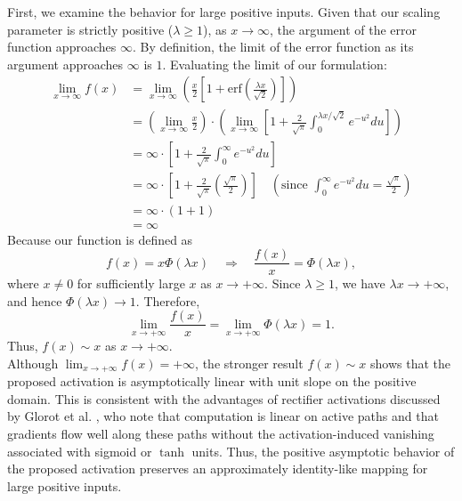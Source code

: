 \documentclass[11pt]{article}
\begin{document}
\noindent First, we examine the behavior for large positive inputs. Given that our scaling parameter is strictly positive ($\lambda \geq 1$), as $x \to \infty$, the argument of the error function approaches $\infty$. By definition, the limit of the error function as its argument approaches $\infty$ is $1$. Evaluating the limit of our formulation:
\begin{align*}
\lim_{x \to \infty} f(x) &= \lim_{x \to \infty} \left( \frac{x}{2} \left[ 1 + \text{erf}\left( \frac{\lambda x}{\sqrt{2}} \right) \right] \right) \\
&= \left( \lim_{x \to \infty} \frac{x}{2} \right) \cdot \left( \lim_{x \to \infty} \left[ 1 + \frac{2}{\sqrt{\pi}} \int_{0}^{\lambda x / \sqrt{2}} e^{-u^2} du \right] \right) \\
&= \infty \cdot \left[ 1 + \frac{2}{\sqrt{\pi}} \int_{0}^{\infty} e^{-u^2} du \right] \\
&= \infty \cdot \left[ 1 + \frac{2}{\sqrt{\pi}} \left( \frac{\sqrt{\pi}}{2} \right) \right] \quad \left(\text{since } \int_{0}^{\infty} e^{-u^2} du = \frac{\sqrt{\pi}}{2}\right) \\
&= \infty \cdot (1 + 1) \\
&= \infty
\end{align*}
\noindent Because our function is defined as 
\begin{equation*}
f(x) = x\Phi(\lambda x)
\quad\Longrightarrow\quad
\frac{f(x)}{x} = \Phi(\lambda x),
\end{equation*}
where $x \neq 0$ for sufficiently large $x$ as $x \rightarrow +\infty$.
Since $\lambda \geq 1$, we have $\lambda x \rightarrow +\infty$, and hence
$\Phi(\lambda x) \rightarrow 1$. Therefore,
\begin{equation*}
\lim_{x\rightarrow +\infty}\frac{f(x)}{x}
=
\lim_{x\rightarrow +\infty}\Phi(\lambda x)
= 1.
\end{equation*}
Thus, $f(x) \sim x$ as $x \rightarrow +\infty$.\\

\noindent Although $\lim_{x\rightarrow+\infty}f(x)=+\infty$, the stronger result
$f(x)\sim x$ shows that the proposed activation is asymptotically linear
with unit slope on the positive domain. This is consistent with the
advantages of rectifier activations discussed by Glorot et al.
\cite{pmlr-v15-glorot11a}, who note that computation is linear on active
paths and that gradients flow well along these paths without the
activation-induced vanishing associated with sigmoid or $\tanh$ units.
Thus, the positive asymptotic behavior of the proposed activation
preserves an approximately identity-like mapping for large positive
inputs.\\
\end{document}
